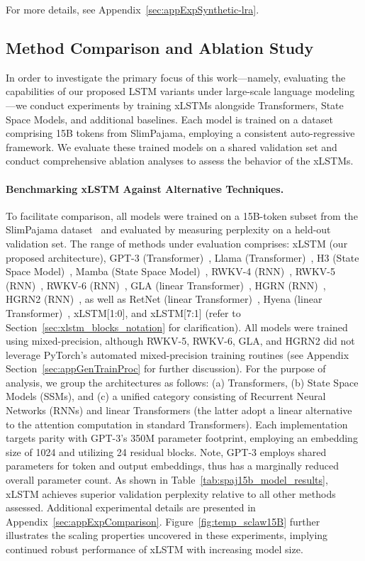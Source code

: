 For more details, see Appendix~\ref{sec:appExpSynthetic-lra}.

\subsection{Method Comparison and Ablation Study}
\label{sec:ExpComparison}

In order to investigate the primary focus of this work—namely, evaluating the capabilities of our proposed LSTM variants under large-scale language modeling—we conduct experiments by training xLSTMs alongside Transformers, State Space Models, and additional baselines. Each model is trained on a dataset comprising 15B tokens from SlimPajama, employing a consistent auto-regressive framework. We evaluate these trained models on a shared validation set and conduct comprehensive ablation analyses to assess the behavior of the xLSTMs.

\paragraph{Benchmarking xLSTM Against Alternative Techniques.} To facilitate comparison, all models were trained on a 15B-token subset from the SlimPajama dataset~\citep{Soboleva:23} and evaluated by measuring perplexity on a held-out validation set. The range of methods under evaluation comprises: xLSTM (our proposed architecture), GPT-3 (Transformer)~\citep{Brown:20short}, Llama (Transformer)~\citep{Touvron:23arxiv}, H3 (State Space Model)~\citep{Fu:23}, Mamba (State Space Model)~\citep{Gu:24arxiv}, RWKV-4 (RNN)~\citep{Peng:23arxivshort}, RWKV-5 (RNN)~\citep{Peng:24arxivshort}, RWKV-6 (RNN)~\citep{Peng:24arxivshort}, GLA (linear Transformer)~\citep{Yang:23arxiv}, HGRN (RNN)~\citep{Qin:23}, HGRN2 (RNN)~\citep{Qin:24arxiv}, as well as RetNet (linear Transformer)~\citep{Sun:23arxiv}, Hyena (linear Transformer)~\citep{Poli:23}, xLSTM[1:0], and xLSTM[7:1] (refer to Section~\ref{sec:xlstm_blocks_notation} for clarification). 
All models were trained using mixed-precision, although RWKV-5, RWKV-6, GLA, and HGRN2 did not leverage PyTorch's automated mixed-precision training routines (see Appendix Section~\ref{sec:appGenTrainProc} for further discussion).
For the purpose of analysis, we group the architectures as follows: (a) Transformers, (b) State Space Models (SSMs), and (c) a unified category consisting of Recurrent Neural Networks (RNNs) and linear Transformers (the latter adopt a linear alternative to the attention computation in standard Transformers). Each implementation targets parity with GPT-3’s 350M parameter footprint, employing an embedding size of 1024 and utilizing 24 residual blocks. Note, GPT-3 employs shared parameters for token and output embeddings, thus has a marginally reduced overall parameter count. 
As shown in Table~\ref{tab:spaj15b_model_results}, xLSTM achieves superior validation perplexity relative to all other methods assessed. Additional experimental details are presented in Appendix~\ref{sec:appExpComparison}. Figure~\ref{fig:temp_sclaw15B} further illustrates the scaling properties uncovered in these experiments, implying continued robust performance of xLSTM with increasing model size.

